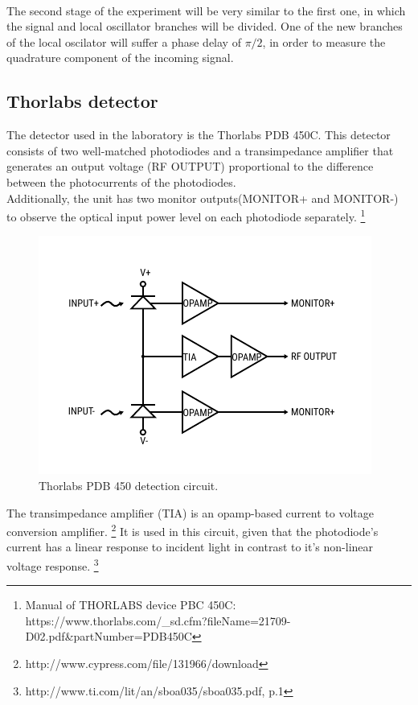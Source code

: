 \begin{bibunit}[plain]
\\
The second stage of the experiment will be very similar to the first one, in which the signal and local oscillator branches will be divided. One of the new branches of the local oscilator will suffer a phase delay of $\pi/2$, in order to measure the quadrature component of the incoming signal.\\
\subsection{Thorlabs detector}
The detector used in the laboratory is the Thorlabs PDB 450C. This detector consists of two well-matched photodiodes and a transimpedance amplifier that generates an output voltage (RF OUTPUT) proportional to the difference between the photocurrents of the photodiodes.\\
Additionally, the unit has two monitor outputs(MONITOR+ and MONITOR-) to observe the optical input power level on each photodiode separately.
\footnote{Manual of THORLABS device PBC 450C: https://www.thorlabs.com/\_sd.cfm?fileName=21709-D02.pdf\&partNumber=PDB450C}
\begin{figure}[H]
	\centering
	\includegraphics{./sdf/optical_detection/figures/thorlabs-circuit.pdf}
	\caption{Thorlabs PDB 450 detection circuit.}
\end{figure}
The transimpedance amplifier (TIA) is an opamp-based current to voltage conversion amplifier.
\footnote{http://www.cypress.com/file/131966/download}
It is used in this circuit, given that the photodiode's current has a linear response to incident light in contrast to it's non-linear voltage response.
\footnote{http://www.ti.com/lit/an/sboa035/sboa035.pdf, p.1}

\end{bibunit}

